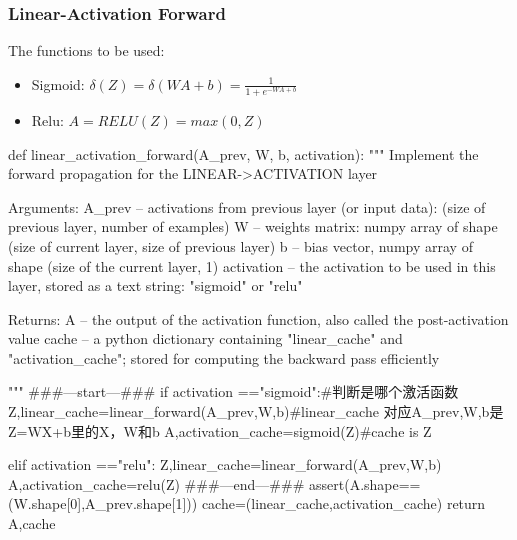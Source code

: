 \documentclass[12pt,a4paper]{article}
\begin{document}
		\subsubsection{Linear-Activation Forward}
			The functions to be used:
			\begin{itemize}
				\item Sigmoid: $\delta(Z)=\delta(WA+b)=\frac{1}{1+e^{-WA+b}}$
				\item Relu:
				$ A=RELU(Z)=max(0,Z)$
			\end{itemize}
			\begin{python}
				def linear_activation_forward(A_prev, W, b, activation):
				"""
				Implement the forward propagation for the LINEAR->ACTIVATION layer
				
				Arguments:
				A_prev -- activations from previous layer (or input data): (size of previous layer, number of examples)
				W -- weights matrix: numpy array of shape (size of current layer, size of previous layer)
				b -- bias vector, numpy array of shape (size of the current layer, 1)
				activation -- the activation to be used in this layer, stored as a text string: "sigmoid" or "relu"
				
				Returns:
				A -- the output of the activation function, also called the post-activation value
				cache -- a python dictionary containing "linear_cache" and "activation_cache";
				stored for computing the backward pass efficiently
				
				"""
				###---start---###
				if activation =="sigmoid":#判断是哪个激活函数
				Z,linear_cache=linear_forward(A_prev,W,b)#linear_cache 对应A_prev,W,b是Z=WX+b里的X，W和b
				A,activation_cache=sigmoid(Z)#cache is Z
				
				elif activation =="relu":
				Z,linear_cache=linear_forward(A_prev,W,b)
				A,activation_cache=relu(Z)
				###---end---###
				assert(A.shape==(W.shape[0],A_prev.shape[1]))
				cache=(linear_cache,activation_cache)
				return A,cache
			\end{python}
		\newpage
\end{document}
